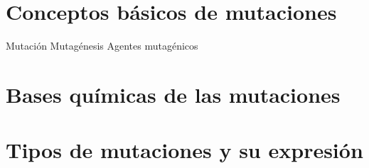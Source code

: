 


\section{Conceptos básicos de mutaciones}

Mutación
Mutagénesis
Agentes mutagénicos

\section{Bases químicas de las mutaciones}



\section{Tipos de mutaciones y su expresión}


